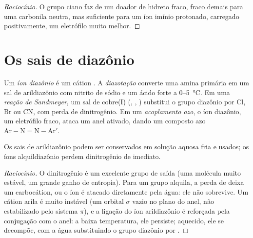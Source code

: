 \begin{proof}[Raciocínio]
O grupo ciano faz de  um doador de hidreto fraco, fraco demais para
uma carbonila neutra, mas suficiente para um íon imínio protonado, carregado
positivamente, um eletrófilo muito melhor.
\end{proof}

\section{Os sais de diazônio}

\begin{definition}\label{def:b2:amines:diazonium}
Um \emph{íon diazônio} é um cátion . A \emph{diazotação}
converte uma amina  primária em um sal de arildiazônio com nitrito de
sódio e um ácido forte a 0--\qty{5}{\degreeCelsius}. Em uma \emph{reação de
Sandmeyer}, um sal de cobre(I)
(, , ) substitui o grupo diazônio por Cl, Br ou CN, com
perda de dinitrogênio. Em um \emph{acoplamento azo}, o íon diazônio,
um eletrófilo fraco, ataca um anel  ativado, dando um composto azo
$\mathrm{Ar{-}N{=}N{-}Ar'}$.
\end{definition}

\begin{proposition}\label{prop:b2:amines:diazonium}
Os sais de arildiazônio podem ser conservados em solução aquosa fria e
usados; os íons alquildiazônio perdem dinitrogênio de imediato.
\end{proposition}

\begin{proof}[Raciocínio]
O dinitrogênio é um excelente grupo de saída (uma molécula muito estável, um
grande ganho de entropia). Para um grupo alquila, a perda de  deixa um
carbocátion, ou o íon é atacado diretamente pela água: ele não sobrevive. Um
cátion arila é muito instável (um orbital $\sigma$ vazio no plano do anel, não
estabilizado pelo sistema $\pi$), e a ligação  do íon arildiazônio é
reforçada pela conjugação com o anel: a baixa temperatura, ele persiste;
aquecido, ele se decompõe, com a água substituindo o grupo diazônio por .
\end{proof}

